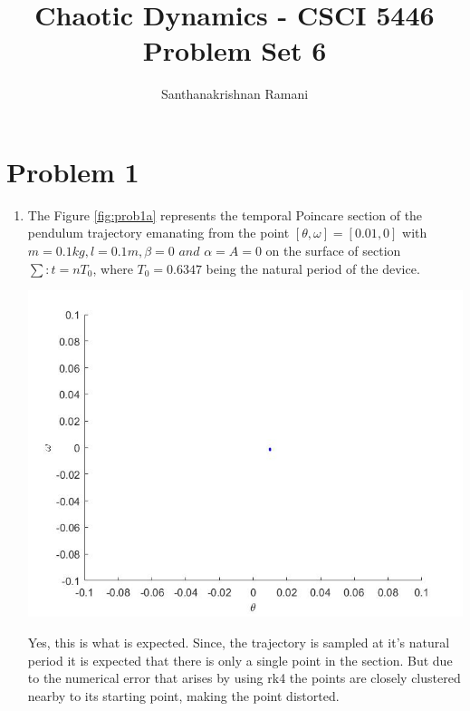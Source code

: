 \documentclass{article}
\title{\textbf{Chaotic Dynamics - CSCI 5446} \\
Problem Set 6}
\author{Santhanakrishnan Ramani}
\begin{document}
\maketitle

\section*{Problem 1}
\begin{enumerate}[label=(\alph*)]

\item 
The Figure \ref{fig:prob1a} represents the temporal Poincare section of the pendulum trajectory emanating from the point $[\theta,\omega] = [0.01,0]$ with $m = 0.1kg, l = 0.1m, \beta = 0 \,\,and\,\, \alpha = A = 0$ on the surface of section $\sum :t = nT_{0}$, where $T_{0} = 0.6347$ being the natural period of the device. \par\medskip
\begin{minipage}{\linewidth}
{
\centering 
\includegraphics[scale=0.4]{images/prob1a.jpg}
\label{fig:prob1a}
}
\par\medskip
Yes, this is what is expected. Since, the trajectory is sampled at it's natural period it is expected that there is only a single point in the section. But due to the numerical error that arises by using rk4 the points are closely clustered nearby to its starting point, making the point distorted.
\end{minipage}


\end{enumerate}
\end{document}
